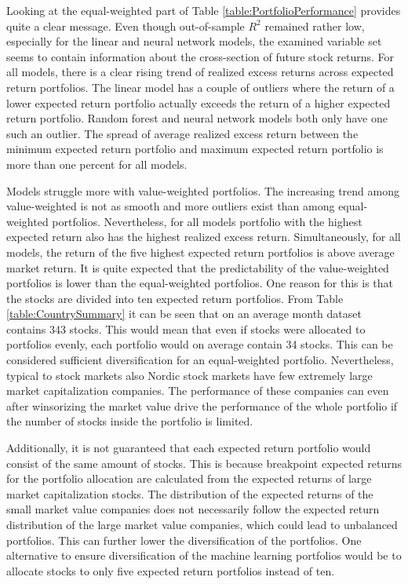 \documentclass[12pt]{article}
\begin{document}
Looking at the equal-weighted part of Table \ref{table:PortfolioPerformance} provides quite a clear message. Even though out-of-sample $R^2$ remained rather low, especially for the linear and neural network models, the examined variable set seems to contain information about the cross-section of future stock returns. For all models, there is a clear rising trend of realized excess returns across expected return portfolios. The linear model has a couple of outliers where the return of a lower expected return portfolio actually exceeds the return of a higher expected return portfolio. Random forest and neural network models both only have one such an outlier. The spread of average realized excess return between the minimum expected return portfolio and maximum expected return portfolio is more than one percent for all models.  \par

Models struggle more with value-weighted portfolios. The increasing trend among value-weighted is not as smooth and more outliers exist than among equal-weighted portfolios. Nevertheless, for all models portfolio with the highest expected return also has the highest realized excess return. Simultaneously, for all models, the return of the five highest expected return portfolios is above average market return. It is quite expected that the predictability of the value-weighted portfolios is lower than the equal-weighted portfolios. One reason for this is that the stocks are divided into ten expected return portfolios. From Table \ref{table:CountrySummary} it can be seen that on an average month dataset contains 343 stocks. This would mean that even if stocks were allocated to portfolios evenly, each portfolio would on average contain 34 stocks. This can be considered sufficient diversification for an equal-weighted portfolio. Nevertheless, typical to stock markets also Nordic stock markets have few extremely large market capitalization companies. The performance of these companies can even after winsorizing the market value drive the performance of the whole portfolio if the number of stocks inside the portfolio is limited. \par

Additionally, it is not guaranteed that each expected return portfolio would consist of the same amount of stocks. This is because breakpoint expected returns for the portfolio allocation are calculated from the expected returns of large market capitalization stocks. The distribution of the expected returns of the small market value companies does not necessarily follow the expected return distribution of the large market value companies, which could lead to unbalanced portfolios. This can further lower the diversification of the portfolios. One alternative to ensure diversification of the machine learning portfolios would be to allocate stocks to only five expected return portfolios instead of ten. \par
\end{document}
